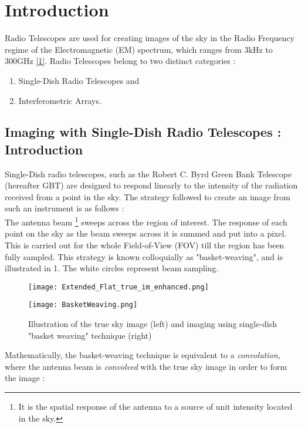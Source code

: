 \documentclass{article}
\begin{document}
\section{Introduction}
Radio Telescopes are used for creating images of the sky in the Radio Frequency regime of the Electromagnetic (EM) spectrum, which ranges from 3kHz to 300GHz \hyperref[ref1]{[1]}. Radio Telescopes belong to two distinct categories :   
\begin{enumerate}
\item Single-Dish Radio Telescopes and
\item Interferometric Arrays.
\end{enumerate}
\label{section1.1}\subsection{Imaging with Single-Dish Radio Telescopes : Introduction}
Single-Dish radio telescopes, such as the Robert C. Byrd Green Bank Telescope (hereafter GBT) are designed to respond linearly to the intensity of the radiation received from a point in the sky. The strategy followed to create an image from such an instrument is as follows : \\
The antenna beam \footnote{It is the spatial response of the antenna to a source of unit intensity located in the sky.} sweeps across the region of interest. The response of each point on the sky as the beam sweeps across it is summed and put into a pixel. This is carried out for the whole Field-of-View (FOV) till the region has been fully sampled. This strategy is known colloquially as "basket-weaving", and is illustrated in \figurename{ 1}. The white circles represent beam sampling.\\
\begin{figure} [H]
\centering
\begin{minipage}[b]{.45\textwidth}
\texttt{[image: Extended\_Flat\_true\_im\_enhanced.png]}
\end{minipage}%
\begin{minipage}[b]{.45\linewidth}
\texttt{[image: BasketWeaving.png]}
\end{minipage}
\caption{Illustration of the true sky image (left) and imaging using single-dish "basket weaving" technique (right)}
\label{ 1}
\end{figure}
Mathematically, the basket-weaving technique is equivalent to a \textit{convolution}, where the antenna beam is \textit{convolved} with the true sky image in order to form the image : 
\end{document}
